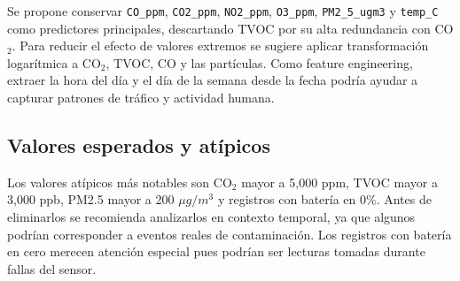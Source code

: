\documentclass{article}
\begin{document}
Se propone conservar \texttt{CO\_ppm}, \texttt{CO2\_ppm}, \texttt{NO2\_ppm}, \texttt{O3\_ppm}, \texttt{PM2\_5\_ugm3} y \texttt{temp\_C} como predictores principales, descartando TVOC por su alta redundancia con CO$_2$. Para reducir el efecto de valores extremos se sugiere aplicar transformación logarítmica a CO$_2$, TVOC, CO y las partículas. Como feature engineering, extraer la hora del día y el día de la semana desde la fecha podría ayudar a capturar patrones de tráfico y actividad humana.

\subsection*{Valores esperados y atípicos}

Los valores atípicos más notables son CO$_2$ mayor a 5,000 ppm, TVOC mayor a 3,000 ppb, PM2.5 mayor a 200 $\mu g/m^3$ y registros con batería en 0\%. Antes de eliminarlos se recomienda analizarlos en contexto temporal, ya que algunos podrían corresponder a eventos reales de contaminación. Los registros con batería en cero merecen atención especial pues podrían ser lecturas tomadas durante fallas del sensor.
\end{document}
